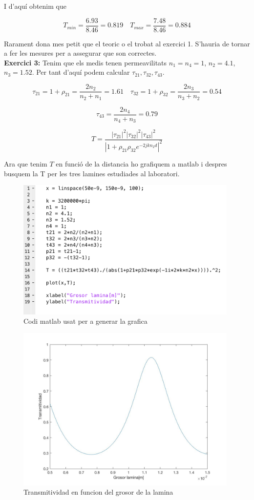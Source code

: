 \documentclass[12pt, a4papre]{article}
\begin{document}
	I d'aquí obtenim que 
	
	\[
		T_{min} = \frac{6.93}{8.46} = 0.819 \quad T_{max} = \frac{7.48}{8.46} = 0.884
	\]
	
	Rarament dona mes petit que el teoric o el trobat al exercici 1. S'hauria de tornar a fer les mesures per a assegurar que son correctes.\\
	
	\textbf{Exercici 3:} Tenim que els medis tenen permeavilitats $n_1 = n_4 = 1$, $n_2 = 4.1$, $n_3 = 1.52$. Per tant d'aquí podem calcular $\tau_{21}, \tau_{32}, \tau_{43}$.
	
	\[
		\tau_{21}= 1+\rho_{21}= \frac{2n_2}{n_2+n_1} = 1.61 \quad \tau_{32}=1+\rho_{32}=\frac{2n_3}{n_3+n_2} = 0.54 
	\]
	
	\[
		\tau_{43}=\frac{2n_4}{n_4+n_3} = 0.79
	\]
	
	\[
		T = \frac{|\tau_{21}|^2|\tau_{32}|^2|\tau_{43}|^2}{|1+\rho_{21}\rho_{32}e^{-2jkn_2d}|^2}
	\]		
	
	Ara que tenim $T$ en funció de la distancia ho grafiquem a matlab i despres busquem la T per les tres lamines estudiades al laboratori.
	
	\begin{figure}[H]
		\begin{center}
		\includegraphics[width=110mm]{pr2_2.png}
		\caption{Codi matlab usat per a generar la grafica}
		\end{center}
	\end{figure}
	
	\begin{figure}[H]
		\begin{center}
		\includegraphics[width=110mm]{pr2_1.jpg}
		\caption{Transmitividad en funcion del grosor de la lamina}
		\end{center}
	\end{figure}
	
\end{document}
